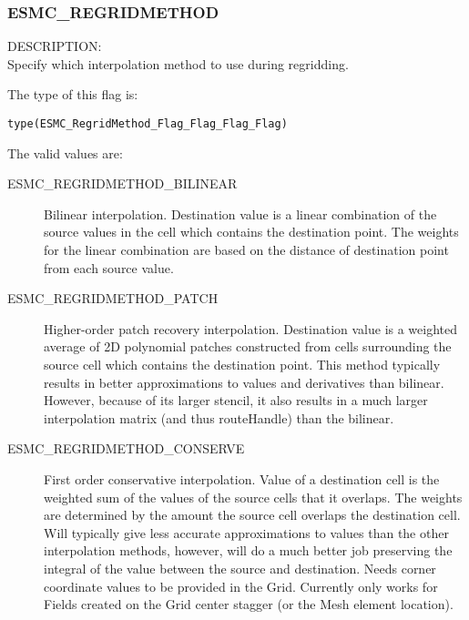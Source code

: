 
\subsubsection{ESMC\_REGRIDMETHOD}
\label{opt:cregridmethod}

{\sf DESCRIPTION:\\}  
Specify which interpolation method to use during regridding. 

The type of this flag is:

{\tt type(ESMC\_RegridMethod\_Flag\_Flag\_Flag\_Flag)}

The valid values are:
\begin{description}
\item [ESMC\_REGRIDMETHOD\_BILINEAR]
      Bilinear interpolation. Destination value is a linear combination of the source values in the cell which contains the destination point. The weights for the linear combination are based on the distance of destination point from each source value. 
\item [ESMC\_REGRIDMETHOD\_PATCH]
      Higher-order patch recovery interpolation. Destination value is a weighted average of 2D polynomial patches constructed from cells surrounding the source cell which contains the destination point. This method typically results in better approximations to values and derivatives than bilinear. However, because of its larger stencil, it also results in a much larger interpolation matrix (and thus routeHandle) than the bilinear. 
\item [ESMC\_REGRIDMETHOD\_CONSERVE]
      First order conservative interpolation. Value of a destination cell is the weighted sum of the values of the source cells that it overlaps. The weights are determined by the amount the source cell overlaps the destination cell. Will typically give less accurate approximations to values than the other interpolation methods, however, will do a much better job preserving the integral of the value between the source and destination.  Needs corner coordinate values to be provided in the Grid. Currently only works for Fields created on the Grid center stagger (or the Mesh element location). 
\end{description}
